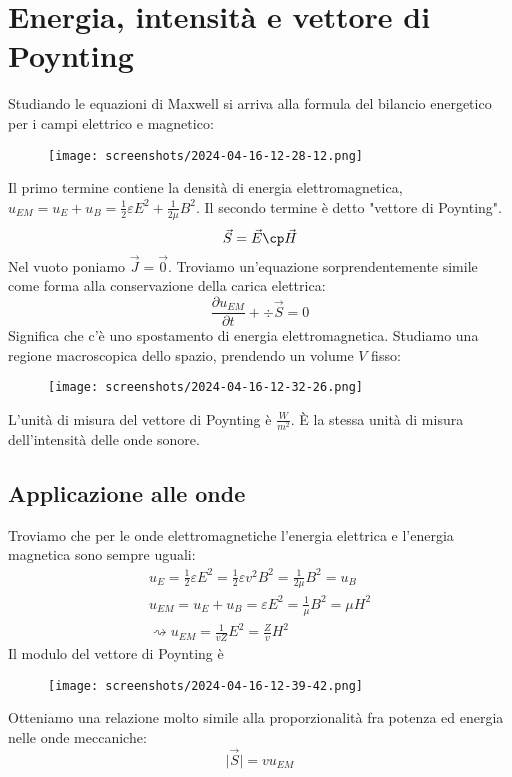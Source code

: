 \section{Energia, intensità e vettore di Poynting}
Studiando le equazioni di Maxwell si arriva alla formula del bilancio energetico per i campi elettrico e magnetico:
\begin{figure}[H]
	\centering
	\texttt{[image: screenshots/2024-04-16-12-28-12.png]}
\end{figure}
Il primo termine contiene la densità di energia elettromagnetica, \(u_{EM} =u_E + u_B= \frac{1}{2} \varepsilon E^2 + \frac{1}{2\mu }B^{2} \). Il secondo termine è detto "vettore di Poynting".
\begin{equation}
	\vec{S}=\vec{E} \cp \vec{H}
\end{equation}
Nel vuoto poniamo \(\vec{J}= \vec{0}\). Troviamo un'equazione sorprendentemente simile come forma alla conservazione della carica elettrica:
\begin{equation}
	\frac{\partial u_{EM} }{\partial t} + \div \vec{S} =0 
\end{equation}
Significa che c'è uno spostamento di energia elettromagnetica. Studiamo una regione macroscopica dello spazio, prendendo un volume \(V\) fisso:
\begin{figure}[H]
	\centering
	\texttt{[image: screenshots/2024-04-16-12-32-26.png]}
\end{figure}
L'unità di misura del vettore di Poynting è \(\unit{\frac{W}{m^2}}\). È la stessa unità di misura dell'intensità delle onde sonore.

\subsection{Applicazione alle onde}
Troviamo che per le onde elettromagnetiche l'energia elettrica e l'energia magnetica sono sempre uguali:
\begin{gather}
	u_E = \frac{1}{2} \varepsilon E^{2} = \frac{1}{2} \varepsilon v^{2} B^{2} = \frac{1}{2 \mu } B^{2} = u_B\\
	u_{EM} = u_E + u_B = \varepsilon E^{2} = \frac{1}{\mu }B^{2} = \mu H^{2}\\
	\rightsquigarrow u_{EM} =\frac{1}{vZ} E^{2} = \frac{Z}{v}H^{2} 
\end{gather}
Il modulo del vettore di Poynting è 
\begin{figure}[H]
	\centering
	\texttt{[image: screenshots/2024-04-16-12-39-42.png]}
\end{figure}
Otteniamo una relazione molto simile alla proporzionalità fra potenza ed energia nelle onde meccaniche:
\begin{equation}
	\vert \vec{S} \vert = v u_{EM} 
\end{equation}

